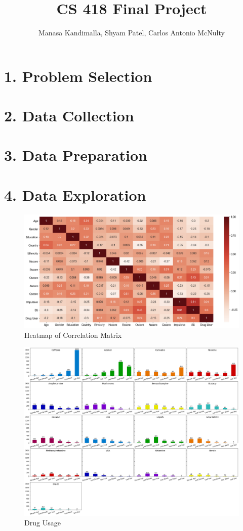 \documentclass[10pt]{article}
\title{CS 418 Final Project}
\author {Manasa Kandimalla, Shyam Patel, Carlos Antonio McNulty}
\begin{document}
\maketitle

\section*{1. Problem Selection}

\section*{2. Data Collection}

\section*{3. Data Preparation}

\section*{4. Data Exploration}


\begin{figure}[H]
\caption{Heatmap of Correlation Matrix}
\centering
\includegraphics[scale=0.25]{heatmap.png}
\end{figure}

\begin{figure}[H]
\caption{Drug Usage}
\centering
\includegraphics[scale=0.35]{drugs.png}
\end{figure}
\end{document}
